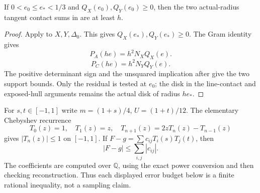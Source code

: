 \begin{lemma}
\label{lem:paper-residual-to-tangency}
If $0<e_0\le e_*<1/3$ and $Q_X(e_0),Q_Y(e_0)\ge0$, then the two
actual-radius tangent contact sums in
 are at least $h$.
\end{lemma}
\begin{proof}
Apply  to $X,Y,\Delta_0$.
This gives $Q_X(e_*),Q_Y(e_*)\ge0$.  The Gram identity gives
\begin{equation}
 P_A(he)=h^2N_XQ_X(e).
 \label{eq:certificate-PA}
\end{equation}
\begin{equation}
 P_C(he)=h^2N_YQ_Y(e).
 \label{eq:certificate-PC}
\end{equation}
The positive determinant sign and the unsquared implication after
 give the two support bounds.
Only the residual is tested at $e_0$; the disk in the line-contact and
exposed-hull arguments remains the actual disk of radius $he_*$.
\end{proof}

For $s,t\in[-1,1]$ write $m=(1+s)/4$, $U=(1+t)/12$.
The elementary Chebyshev recurrence
\[
 T_0(z)=1,\quad T_1(z)=z,\quad T_{n+1}(z)=2zT_n(z)-T_{n-1}(z)
\]
gives $|T_n(z)|\le1$ on $[-1,1]$.
If $F-g=\sum c_{ij}T_i(s)T_j(t)$, then
\begin{equation}
 |F-g|\le\sum_{i,j}|c_{ij}|.
 \label{eq:f-chebyshev-budget}
\end{equation}
The coefficients are computed over $\mathbb Q$, using the exact power
conversion and then checking reconstruction.  Thus each displayed error
budget below is a finite rational inequality, not a sampling claim.


